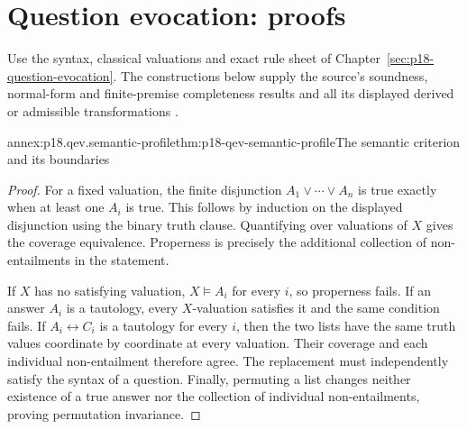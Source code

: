 \section{Question evocation: proofs}
\label{sec:annex-p18-question-evocation}

Use the syntax, classical valuations and exact rule sheet of
Chapter~\ref{sec:p18-question-evocation}. The constructions below supply
the source's soundness, normal-form and finite-premise completeness
results and all its displayed derived or admissible transformations
\cite[secs.~2--5]{Wisniewski2016QuestionEvocation}.

\begin{annexitem}{annex:p18.qev.semantic-profile}{thm:p18-qev-semantic-profile}{The semantic criterion and its boundaries}
\begin{proof}
For a fixed valuation, the finite disjunction
\(A_1\lor\cdots\lor A_n\) is true exactly when at least one
\(A_i\) is true. This follows by induction on the displayed
disjunction using the binary truth clause. Quantifying over valuations
of \(X\) gives the coverage equivalence. Properness is precisely
the additional collection of non-entailments in the statement.

If \(X\) has no satisfying valuation, \(X\models A_i\) for
every \(i\), so properness fails. If an answer \(A_i\) is a
tautology, every \(X\)-valuation satisfies it and the same condition
fails. If \(A_i\leftrightarrow C_i\) is a tautology for every
\(i\), then the two lists have the same truth values coordinate by
coordinate at every valuation. Their coverage and each individual
non-entailment therefore agree. The replacement must independently
satisfy the syntax of a question. Finally, permuting a list changes
neither existence of a true answer nor the collection of individual
non-entailments, proving permutation invariance.
\end{proof}
\end{annexitem}

